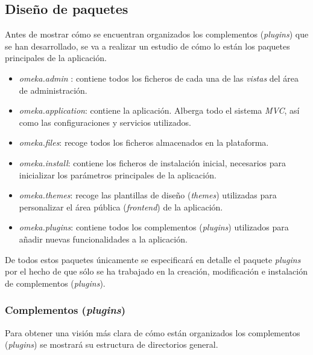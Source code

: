 \subsection{Diseño de paquetes}

Antes de mostrar cómo se encuentran organizados los complementos
(\emph{plugins}) que se han desarrollado, se va a realizar un estudio de
cómo lo están los paquetes principales de la aplicación.


\begin{itemize}
\tightlist
\item
  \emph{omeka.admin} : contiene todos los ficheros de cada una de las
  \emph{vistas} del área de administración.
\item
  \emph{omeka.application}: contiene la aplicación. Alberga todo el
  sistema \emph{MVC}, así como las configuraciones y servicios
  utilizados.
\item
  \emph{omeka.files}: recoge todos los ficheros almacenados en la
  plataforma.
\item
  \emph{omeka.install}: contiene los ficheros de instalación inicial,
  necesarios para inicializar los parámetros principales de la
  aplicación.
\item
  \emph{omeka.themes}: recoge las plantillas de diseño (\emph{themes})
  utilizadas para personalizar el área pública (\emph{frontend}) de la
  aplicación.
\item
  \emph{omeka.plugins}: contiene todos los complementos (\emph{plugins})
  utilizados para añadir nuevas funcionalidades a la aplicación.
\end{itemize}

De todos estos paquetes únicamente se especificará en detalle el paquete
\emph{plugins} por el hecho de que sólo se ha trabajado en la creación,
modificación e instalación de complementos (\emph{plugins}).


\subsubsection{Complementos (\emph{plugins})}

Para obtener una visión más clara de cómo están organizados los
complementos (\emph{plugins}) se mostrará su estructura de directorios
general.


